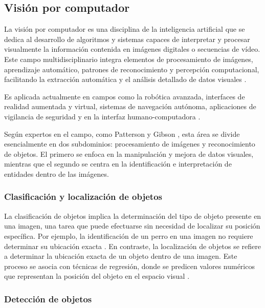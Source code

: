 \subsection{Visión por computador}

La visión por computador es una disciplina de la inteligencia artificial que se dedica al desarrollo de algoritmos y sistemas capaces de interpretar y procesar visualmente la información contenida en imágenes digitales o secuencias de vídeo. Este campo multidisciplinario integra elementos de procesamiento de imágenes, aprendizaje automático, patrones de reconocimiento y percepción computacional, facilitando la extracción automática y el análisis detallado de datos visuales \cite{szeliski2022computer}.

Es aplicada actualmente en campos como la robótica avanzada, interfaces de realidad aumentada y virtual, sistemas de navegación autónoma, aplicaciones de vigilancia de seguridad y en la interfaz humano-computadora \cite{geron2019hands}.

Según expertos en el campo, como Patterson y Gibson , esta área se divide esencialmente en dos subdominios: procesamiento de imágenes y reconocimiento de objetos. El primero se enfoca en la manipulación y mejora de datos visuales, mientras que el segundo se centra en la identificación e interpretación de entidades dentro de las imágenes.

\subsubsection{Clasificación y localización de objetos}

La clasificación de objetos implica la determinación del tipo de objeto presente en una imagen, una tarea que puede efectuarse sin necesidad de localizar su posición específica. Por ejemplo, la identificación de un perro en una imagen no requiere determinar su ubicación exacta \cite{szeliski2022computer}. En contraste, la localización de objetos se refiere a determinar la ubicación exacta de un objeto dentro de una imagen. Este proceso se asocia con técnicas de regresión, donde se predicen valores numéricos que representan la posición del objeto en el espacio visual \cite{geron2019hands}.

\subsubsection{Detección de objetos}

